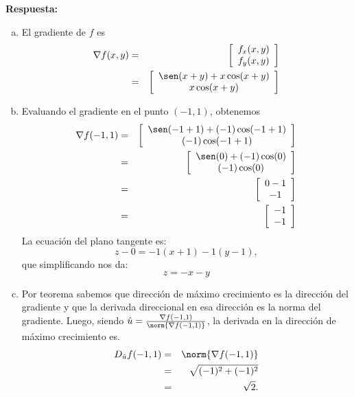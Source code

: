 \documentclass{article}
\begin{document}
\vspace{5mm}
\noindent\textbf{Respuesta:}
\begin{enumerate}[a)]
  \item El gradiente de $f$ es
    \begin{eqnarray*}
      \nabla f(x,y) &=& \left[\begin{array}{c}f_x(x,y) \\ f_y(x,y) \end{array} \right] \\
        &=& \left[\begin{array}{c} \sen(x+y) + x\cos(x+y) \\ x\cos(x+y) \end{array} \right]
    \end{eqnarray*}
  \item Evaluando el gradiente en el punto $( -1, 1)$, obtenemos
    \begin{eqnarray*}
      \nabla f(-1, 1) &=& \left[\begin{array}{c} \sen(-1+1) + (-1)\cos(-1+1) \\ (-1)\cos(-1+1) \end{array} \right] \\
        &=& \left[\begin{array}{c} \sen(0) + (-1)\cos(0) \\ (-1)\cos(0) \end{array} \right] \\
        &=& \left[\begin{array}{c} 0 - 1 \\ -1 \end{array} \right] \\
        &=& \left[\begin{array}{c} -1 \\ -1 \end{array} \right]
    \end{eqnarray*}
    La ecuación del plano tangente es:
    $$z - 0 = -1(x + 1) - 1(y - 1),$$
    que simplificando nos da:
    $$z = -x - y$$
  \item Por teorema sabemos que dirección de máximo crecimiento es la dirección del gradiente y que la derivada direccional en esa dirección es la norma del gradiente. Luego, siendo $\hat{u} = \frac{\nabla f(-1, 1)}{\norm{\nabla f(-1, 1)}}$, la derivada en la dirección de máximo crecimiento es.
    \begin{eqnarray*}
      D_{\hat{u}}f(-1, 1) &=& \norm{\nabla f(-1, 1)} \\
        &=& \sqrt{(-1)^2 + (-1)^2} \\
        &=& \sqrt{2}.
    \end{eqnarray*}
\end{enumerate}
\end{document}

